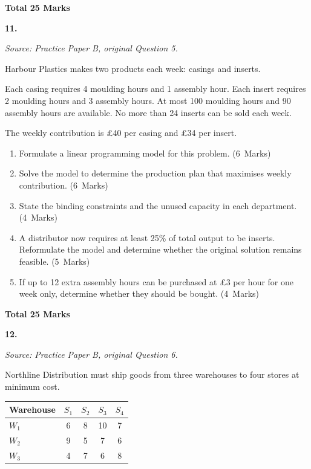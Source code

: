 \documentclass[11pt,a4paper]{article}
\newcommand{\markalloc}[1]{\nobreak\hfill\mbox{(#1 Marks)}}
\newcommand{\questiontotal}[1]{\begin{flushright}\textbf{Total #1 Marks}\end{flushright}}
\begin{document}
\questiontotal{25}

\newpage

\textbf{11.}

\textit{Source: Practice Paper B, original Question 5.}



Harbour Plastics makes two products each week: casings and inserts.

Each casing requires 4 moulding hours and 1 assembly hour.
Each insert requires 2 moulding hours and 3 assembly hours.
At most 100 moulding hours and 90 assembly hours are available.
No more than 24 inserts can be sold each week.

The weekly contribution is \pounds40 per casing and \pounds34 per insert.

\begin{enumerate}
\item Formulate a linear programming model for this problem. \markalloc{6}

\item Solve the model to determine the production plan that maximises weekly contribution. \markalloc{6}

\item State the binding constraints and the unused capacity in each department. \markalloc{4}

\item A distributor now requires at least 25\% of total output to be inserts. Reformulate the model and determine whether the original solution remains feasible. \markalloc{5}

\item If up to 12 extra assembly hours can be purchased at \pounds3 per hour for one week only, determine whether they should be bought. \markalloc{4}
\end{enumerate}

\questiontotal{25}

\newpage

\textbf{12.}

\textit{Source: Practice Paper B, original Question 6.}



Northline Distribution must ship goods from three warehouses to four stores at minimum cost.

\begin{center}
\begin{tabular}{lcccc}
\toprule
Warehouse & $S_1$ & $S_2$ & $S_3$ & $S_4$ \\
\midrule
$W_1$ & 6 & 8 & 10 & 7 \\
$W_2$ & 9 & 5 & 7 & 6 \\
$W_3$ & 4 & 7 & 6 & 8 \\
\bottomrule
\end{tabular}
\end{center}
\end{document}
